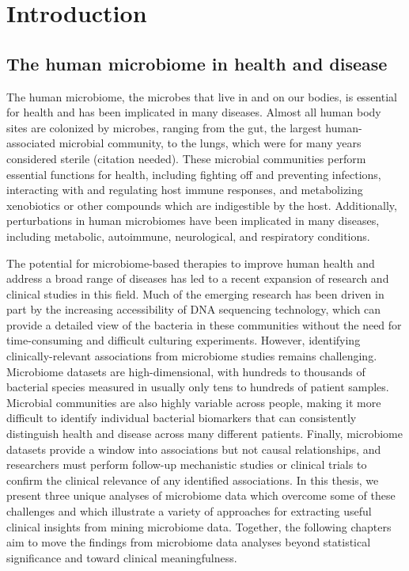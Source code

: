 
\chapter{Introduction}

\section{The human microbiome in health and disease}

The human microbiome, the microbes that live in and on our bodies, is essential for health and has been implicated in many diseases.
Almost all human body sites are colonized by microbes, ranging from the gut, the largest human-associated microbial community, to the lungs, which were for many years considered sterile (citation needed).
These microbial communities perform essential functions for health, including fighting off and preventing infections, interacting with and regulating host immune responses, and metabolizing xenobiotics or other compounds which are indigestible by the host.
Additionally, perturbations in human microbiomes have been implicated in many diseases, including metabolic, autoimmune, neurological, and respiratory conditions.

The potential for microbiome-based therapies to improve human health and address a broad range of diseases has led to a recent expansion of research and clinical studies in this field.
Much of the emerging research has been driven in part by the increasing accessibility of DNA sequencing technology, which can provide a detailed view of the bacteria in these communities without the need for time-consuming and difficult culturing experiments.
However, identifying clinically-relevant associations from microbiome studies remains challenging.
Microbiome datasets are high-dimensional, with hundreds to thousands of bacterial species measured in usually only tens to hundreds of patient samples.
Microbial communities are also highly variable across people, making it more difficult to identify individual bacterial biomarkers that can consistently distinguish health and disease across many different patients.
Finally, microbiome datasets provide a window into associations but not causal relationships, and researchers must perform follow-up mechanistic studies or clinical trials to confirm the clinical relevance of any identified associations.
In this thesis, we present three unique analyses of microbiome data which overcome some of these challenges and which illustrate a variety of approaches for extracting useful clinical insights from mining microbiome data.
Together, the following chapters aim to move the findings from microbiome data analyses beyond statistical significance and toward clinical meaningfulness.


